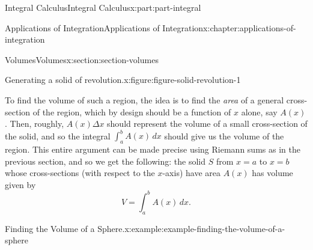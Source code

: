 \documentclass[twoside,10pt,]{book}
\numberwithin{equation}{part}
\begin{document}
\begin{partptx}{Integral Calculus}{}{Integral Calculus}{}{}{x:part:part-integral}
\begin{chapterptx}{Applications of Integration}{}{Applications of Integration}{}{}{x:chapter:applications-of-integration}
\begin{sectionptx}{Volumes}{}{Volumes}{}{}{x:section:section-volumes}
\begin{figureptx}{Generating a solid of revolution.}{x:figure:figure-solid-revolution-1}{}
\begin{sidebyside}{2}{0}{0}{0}
\begin{sbspanel}{0.5}
{
}%
\end{sbspanel}%
\begin{sbspanel}{0.5}%
%
\end{sbspanel}%
\end{sidebyside}%
\tcblower
\end{figureptx}%
To find the volume of such a region, the idea is to find the \emph{area} of a general cross-section of the region, which by design should be a function of \(x\) alone, say \(A(x)\). Then, roughly, \(A(x)\Delta x\) should represent the volume of a small cross-section of the solid, and so the integral \(\int_{a}^{b}A(x)\,dx\) should give us the volume of the region. This entire argument can be made precise using Riemann sums as in the previous section, and so we get the following: the solid \(S\) from \(x = a\) to \(x = b\) whose cross-sections (with respect to the \(x\)-axis) have area \(A(x)\) has volume given by%
\begin{equation}
V = \int_{a}^{b}A(x)\,dx.\label{x:men:equation-solid-revolution-volume}
\end{equation}
%
\begin{example}{Finding the Volume of a Sphere.}{x:example:example-finding-the-volume-of-a-sphere}%

\end{example}
\end{sectionptx}
\end{chapterptx}
\end{partptx}
\end{document}
